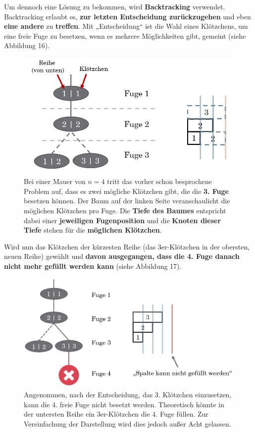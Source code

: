 \documentclass[a4paper,12pt]{article}
\begin{document}
Um dennoch eine Lösung zu bekommen, wird \textbf{Backtracking} verwendet. Backtracking erlaubt es, \textbf{zur letzten Entscheidung zurückzugehen} und eben \textbf{eine andere} zu \textbf{treffen}. Mit „Entscheidung“ ist die Wahl eines Klötzchens, um eine freie Fuge zu besetzen, wenn es mehrere Möglichkeiten gibt, gemeint (siehe Abbildung 16).
\begin{figure}[H]
    \centering
    \includegraphics[width=1\linewidth]{Bilder/Aufgabe1/Backtracking_01.png}
    \caption{Bei einer Mauer von $n = 4$ tritt das vorher schon besprochene Problem auf, dass es zwei mögliche Klötzchen gibt, die die \textbf{3. Fuge} besetzen können. Der Baum auf der linken Seite veranschaulicht die möglichen Klötzchen pro Fuge. Die \textbf{Tiefe des Baumes} entspricht dabei einer \textbf{jeweiligen Fugenposition} und die \textbf{Knoten dieser Tiefe} stehen für die \textbf{möglichen Klötzchen}.}
\end{figure}
Wird nun das Klötzchen der kürzesten Reihe (das 3er-Klötzchen in der obersten, neuen Reihe) gewählt und \textbf{davon ausgegangen, dass die 4. Fuge danach nicht mehr gefüllt werden kann} (siehe Abbildung 17).
\begin{figure}[H]
    \centering
    \includegraphics[width=1\linewidth]{Bilder/Aufgabe1/Backtracking_02.png}
    \caption{Angenommen, nach der Entscheidung, das 3. Klötzchen einzusetzen, kann die 4. freie Fuge nicht besetzt werden. Theoretisch könnte in der untersten Reihe ein 3er-Klötzchen die 4. Fuge füllen. Zur Vereinfachung der Darstellung wird dies jedoch außer Acht gelassen.}
\end{figure}
\end{document}
